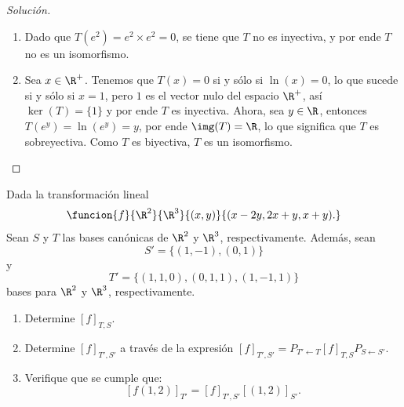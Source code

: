 \documentclass[a4,11pt]{aleph-notas}
\begin{document}
\begin{proof}[Solución]
\begin{enumerate}
        \item Dado que $T(e^2) = e^2\times e^2 = 0$, se tiene que $T$ no es inyectiva, y por ende $T$ no es un isomorfismo.
        \item Sea $x\in\R^+$. Tenemos que $T(x)=0$ si y sólo si $\ln(x)=0$, lo que sucede si y sólo si $x=1$, pero $1$ es el vector nulo del espacio $\R^+$, así $\ker(T)=\{1\}$ y por ende $T$ es inyectiva. Ahora, sea $y\in\R$, entonces $T(e^y) = \ln(e^y) = y$, por ende $\img(T)=\R$, lo que significa que $T$ es sobreyectiva. Como $T$ es biyectiva, $T$ es un isomorfismo.
    \end{enumerate}
\end{proof}


\begin{ejer}
    Dada la transformación lineal
    \[
        \funcion{f}{\R^{2}}{\R^{3}}{(x,y)}{(x-2y,2x+y,x+y).}
    \]
    Sean $S$ y $T$ las bases canónicas de $\R^{2}$ y $\R^{3}$, respectivamente. Además, sean 
    \[
        S' = \{(1, -1),(0, 1)\}
    \] 
    y
    \[
        T' = \{(1,1,0), (0,1,1), (1,-1,1)\}
    \]
    bases para $\R^{2}$ y $\R^{3}$, respectivamente.
    \begin{enumerate}
        \item Determine $[f]_{T,S}$. %
        \item Determine $[f]_{T',S'}$ a través de la expresión $[f]_{T',S'} = P_{T'\leftarrow T} [f]_{T,S} P_{S\leftarrow S'}$.
        \item Verifique que se cumple que:
        \[
            [f(1,2)]_{T'} = [f]_{T',S'}[(1,2)]_{S'}.
        \]
    \end{enumerate}
\end{ejer}
\end{document}
